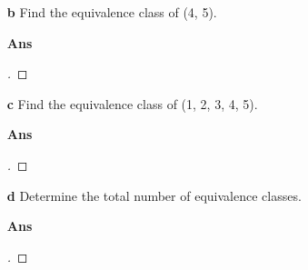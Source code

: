 \documentclass[paper=usletter, fontsize=12pt]{article}
\begin{document}
\begin{itemize}
\begin{itemize}
\begin{itemize}
                \item[\textbf{b}] Find the equivalence class of (4, 5).
                \item[\textbf{Ans}]
                \begin{proof}[\unskip\nopunct]
                \end{proof}
                \vspace{0.2in}

                \item[\textbf{c}] Find the equivalence class of (1, 2, 3, 4, 5).
                \item[\textbf{Ans}]
                \begin{proof}[\unskip\nopunct]
                \end{proof}
                \vspace{0.2in}

                \item[\textbf{d}] Determine the total number of equivalence
                classes.
                \item[\textbf{Ans}]
                \begin{proof}[\unskip\nopunct]
                \end{proof}
                \vspace{0.2in}

            \end{itemize}

        \end{itemize}

    \end{itemize}
\end{document}
